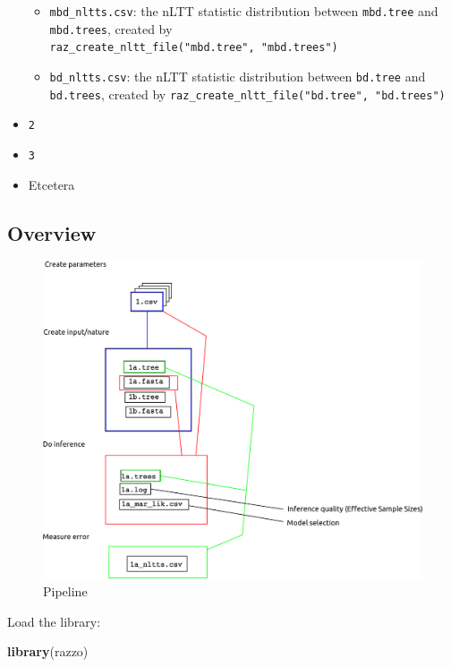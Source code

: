 \documentclass[]{article}
\newenvironment{Shaded}{\begin{snugshade}}{\end{snugshade}}
\newcommand{\KeywordTok}[1]{\textcolor[rgb]{0.13,0.29,0.53}{\textbf{#1}}}
\newcommand{\NormalTok}[1]{#1}
\begin{document}
\begin{itemize}
\begin{itemize}
  \item
    \texttt{mbd\_nltts.csv}: the nLTT statistic distribution between
    \texttt{mbd.tree} and \texttt{mbd.trees}, created by
    \texttt{raz\_create\_nltt\_file("mbd.tree",\ "mbd.trees")}
  \item
    \texttt{bd\_nltts.csv}: the nLTT statistic distribution between
    \texttt{bd.tree} and \texttt{bd.trees}, created by
    \texttt{raz\_create\_nltt\_file("bd.tree",\ "bd.trees")}
  \end{itemize}
\item
  \texttt{2}
\item
  \texttt{3}
\item
  Etcetera
\end{itemize}

\subsection{Overview}\label{overview}

\begin{figure}
\centering
\includegraphics{pipeline.png}
\caption{Pipeline}
\end{figure}

Load the library:

\begin{Shaded}
\begin{Highlighting}[]
\KeywordTok{library}\NormalTok{(razzo)}
\end{Highlighting}
\end{Shaded}
\end{document}
